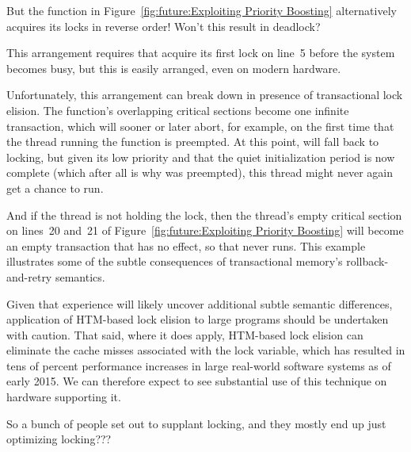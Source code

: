 \QuickQuiz{}
	But the  function in
	Figure~\ref{fig:future:Exploiting Priority Boosting}
	alternatively acquires its locks in reverse order!
	Won't this result in deadlock?
 \QuickQuizEnd

This arrangement requires that  acquire its first
lock on line~5 before the system becomes busy, but this is easily
arranged, even on modern hardware.

Unfortunately, this arrangement can break down in presence of transactional
lock elision.
The  function's overlapping critical sections become
one infinite transaction, which will sooner or later abort,
for example, on the first time that the thread running
the  function is preempted.
At this point,  will fall back to locking, but given
its low priority and that the quiet initialization period is now
complete (which after all is why  was preempted),
this thread might never again get a chance to run.

And if the  thread is not holding the lock, then
the  thread's empty critical section on lines~20 and~21 of
Figure~\ref{fig:future:Exploiting Priority Boosting}
will become an empty transaction that has no effect, so that
 never runs.
This example illustrates some of the subtle consequences of
transactional memory's rollback-and-retry semantics.

Given that experience will likely uncover additional subtle semantic
differences, application of HTM-based lock elision to large programs
should be undertaken with caution.
That said, where it does apply, HTM-based lock elision can eliminate
the cache misses associated with the lock variable, which has resulted
in tens of percent performance increases in large real-world software
systems as of early 2015.
We can therefore expect to see substantial use of this technique on
hardware supporting it.

\QuickQuiz{}
	So a bunch of people set out to supplant locking, and they
	mostly end up just optimizing locking???
 \QuickQuizEnd

